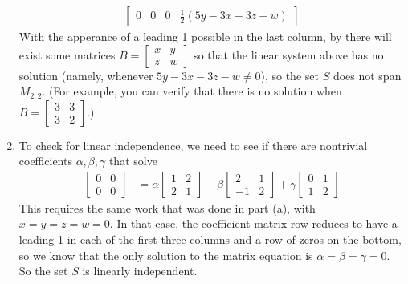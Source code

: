 \begin{enumerate}
\begin{align*}
\begin{bmatrix}
0 & 0 & 0 & \frac{1}{2}(5y - 3x - 3z - w)
\end{bmatrix}
\end{align*}
%
With the apperance of a leading 1 possible in the last column, by  there will exist some matrices 
$B = \begin{bmatrix}x & y \\ z & w \end{bmatrix}$ so that the linear system above has no solution (namely, whenever $5y - 3x - 3z - w \ne 0$), so the set $S$ does not span $M_{2,2}$. (For example, you can verify that there is no solution when $B = \begin{bmatrix} 3 & 3 \\ 3 & 2\end{bmatrix}$.)
%
\item 
To check for linear independence, we need to see if there are nontrivial coefficients $\alpha, \beta, \gamma$ that solve 
%
\begin{align*}
\begin{bmatrix}0 & 0 \\ 0 & 0\end{bmatrix} 
&= 
\alpha\begin{bmatrix} 1& 2\\2 & 1 \end{bmatrix} + 
\beta\begin{bmatrix} 2 & 1\\ -1 & 2\end{bmatrix}+ 
\gamma\begin{bmatrix} 0 & 1\\ 1 & 2\end{bmatrix}
\end{align*}
%
This requires the same work that was done in part (a), with $x = y = z = w = 0$.
In that case, the coefficient matrix row-reduces to have a leading 1 in each of the first three columns and a row of zeros on the bottom, so we know that the only solution to the matrix equation is $\alpha = \beta = \gamma = 0$.  So the set $S$ is linearly independent.
\end{enumerate}